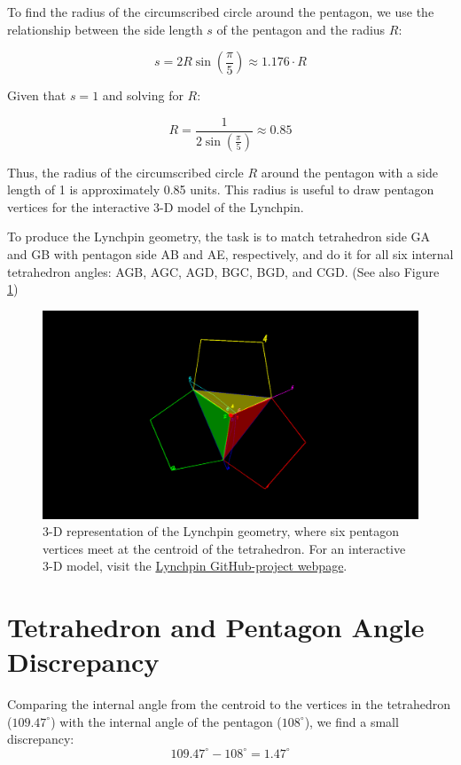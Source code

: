 \documentclass[a4paper,12pt]{article}
\begin{document}
\noindent
To find the radius of the circumscribed circle around the pentagon, we use the relationship between the side length \( s \) of the pentagon and the radius \( R \):

\[
s = 2R \sin\left(\frac{\pi}{5}\right) \approx 1.176 \cdot R
\]

\noindent
Given that \( s = 1 \) and solving for \( R \):

\[
R = \frac{1}{2 \sin\left(\frac{\pi}{5}\right)} \approx 0.85
\]

\noindent
Thus, the radius of the circumscribed circle \( R \) around the pentagon with a side length of 1 is approximately 0.85 units. This radius is useful to draw pentagon vertices for the interactive 3-D model of the Lynchpin.

To produce the Lynchpin geometry, the task is to match tetrahedron side GA and GB with pentagon side AB and AE, respectively, and do it for all six internal tetrahedron angles: AGB, AGC, AGD, BGC, BGD, and CGD. (See also Figure \ref{fig:3d-lynchpin})

\begin{figure}[h]
\centering
\includegraphics[width=\textwidth]{3d-lynchpin.png}
\caption{3-D representation of the Lynchpin geometry, where six pentagon vertices meet at the centroid of the tetrahedron. For an interactive 3-D model, visit the \href{https://markomanninen.github.io/lynchpin}{Lynchpin GitHub-project webpage}.}
\label{fig:3d-lynchpin}
\end{figure}


\section{Tetrahedron and Pentagon Angle Discrepancy}
Comparing the internal angle from the centroid to the vertices in the tetrahedron (\( 109.47^\circ \)) with the internal angle of the pentagon (\( 108^\circ \)), we find a small discrepancy:
\[
109.47^\circ - 108^\circ = 1.47^\circ
\]
\end{document}
